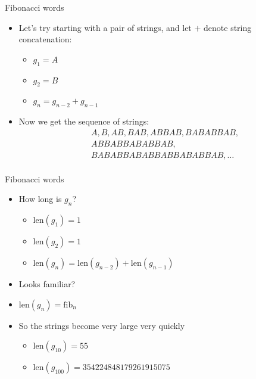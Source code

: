 \documentclass{beamer}
\begin{document}
\begin{frame}[plain]{Fibonacci words}
    \begin{itemize}
        \item Let's try starting with a pair of strings, and let $+$ denote string concatenation:
            \begin{itemize}
                \item $g_1 = A$
                \item $g_2 = B$
                \item $g_n = g_{n-2} + g_{n-1}$
            \end{itemize}
        \vspace{10pt}
        \item Now we get the sequence of strings:
        \begin{align*}
        &A, B, AB, BAB, ABBAB, BABABBAB, \\
        &ABBABBABABBAB, \\
        &BABABBABABBABBABABBAB, \ldots \\
        \end{align*}
    \end{itemize}
\end{frame}

\begin{frame}[plain]{Fibonacci words}
    \begin{itemize}
        \item How long is $g_n$?
        \begin{itemize}
            \item $\mathrm{len}(g_1) = 1$
            \item $\mathrm{len}(g_2) = 1$
            \item $\mathrm{len}(g_n) = \mathrm{len}(g_{n-2}) + \mathrm{len}(g_{n-1})$
        \end{itemize}
        \vspace{5pt}
        \item Looks familiar?
        \vspace{2pt}
        \item $\mathrm{len}(g_n) = \mathrm{fib}_{n}$
        \vspace{10pt}
        \item So the strings become very large very quickly
        \begin{itemize}
            \item $\mathrm{len}(g_{10}) = 55$
            \item $\mathrm{len}(g_{100}) = 354224848179261915075$
        \end{itemize}
    \end{itemize}
\end{frame}
\end{document}
